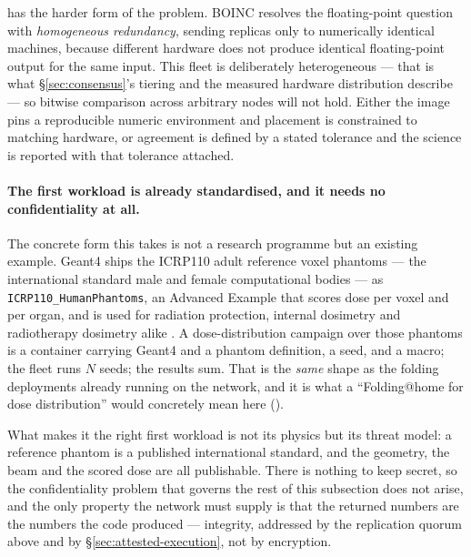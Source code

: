 \Flux{} has the harder form of the problem. BOINC resolves the floating-point question with
\emph{homogeneous redundancy}, sending replicas only to numerically identical machines, because
different hardware does not produce identical floating-point output for the same input. This fleet is
deliberately heterogeneous --- that is what \S\ref{sec:consensus}'s tiering and the measured hardware
distribution describe --- so bitwise comparison across arbitrary nodes will not hold. Either the
image pins a reproducible numeric environment and placement is constrained to matching hardware, or
agreement is defined by a stated tolerance and the science is reported with that tolerance attached.

\paragraph{The first workload is already standardised, and it needs no confidentiality at all.}
The concrete form this takes is not a research programme but an existing example. Geant4 ships the
ICRP110 adult reference voxel phantoms --- the international standard male and female computational
bodies --- as \texttt{ICRP110\_HumanPhantoms}, an Advanced Example that scores dose per voxel and per
organ, and is used for radiation protection, internal dosimetry and radiotherapy dosimetry alike
. A dose-distribution campaign over those phantoms is a container carrying Geant4 and a
phantom definition, a seed, and a macro; the fleet runs $N$ seeds; the results sum. That is the
\emph{same} shape as the folding deployments already running on the network, and it is what a
``Folding@home for dose distribution'' would concretely mean here  (\planned).

What makes it the right first workload is not its physics but its threat model: a reference phantom
is a published international standard, and the geometry, the beam and the scored dose are all
publishable. There is nothing to keep secret, so the confidentiality problem that governs the rest of
this subsection does not arise, and the only property the network must supply is that the returned
numbers are the numbers the code produced --- integrity, addressed by the replication quorum above
and by \S\ref{sec:attested-execution}, not by encryption.

